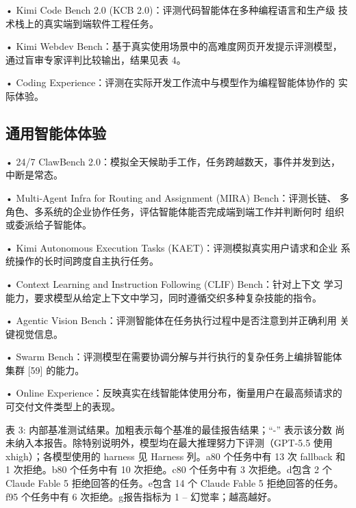 \documentclass[
  10
]{article}
\begin{document}
• Kimi Code Bench 2.0 (KCB 2.0)：评测代码智能体在多种编程语言和生产级
技术栈上的真实端到端软件工程任务。

• Kimi Webdev Bench：基于真实使用场景中的高难度网页开发提示评测模型，
通过盲审专家评判比较输出，结果见表 4。

• Coding Experience：评测在实际开发工作流中与模型作为编程智能体协作的
实际体验。

\subsection{通用智能体体验}\label{general-agent-experience}

• 24/7 ClawBench 2.0：模拟全天候助手工作，任务跨越数天，事件并发到达，
中断是常态。

• Multi-Agent Infra for Routing and Assignment (MIRA) Bench：评测长链、
多角色、多系统的企业协作任务，评估智能体能否完成端到端工作并判断何时
组织或委派给子智能体。

• Kimi Autonomous Execution Tasks (KAET)：评测模拟真实用户请求和企业
系统操作的长时间跨度自主执行任务。

• Context Learning and Instruction Following (CLIF) Bench：针对上下文
学习能力，要求模型从给定上下文中学习，同时遵循交织多种复杂技能的指令。

• Agentic Vision Bench：评测智能体在任务执行过程中是否注意到并正确利用
关键视觉信息。

• Swarm Bench：评测模型在需要协调分解与并行执行的复杂任务上编排智能体
集群 {[}59{]} 的能力。

• Online Experience：反映真实在线智能体使用分布，衡量用户在最高频请求的
可交付文件类型上的表现。

表 3: 内部基准测试结果。加粗表示每个基准的最佳报告结果；``-'' 表示该分数
尚未纳入本报告。除特别说明外，模型均在最大推理努力下评测（GPT-5.5 使用
xhigh）；各模型使用的 harness 见 Harness 列。a80 个任务中有 13 次 fallback
和 1 次拒绝。b80 个任务中有 10 次拒绝。c80 个任务中有 3 次拒绝。d包含 2 个
Claude Fable 5 拒绝回答的任务。e包含 14 个 Claude Fable 5 拒绝回答的任务。
f95 个任务中有 6 次拒绝。g报告指标为 1 -- 幻觉率；越高越好。
\end{document}

